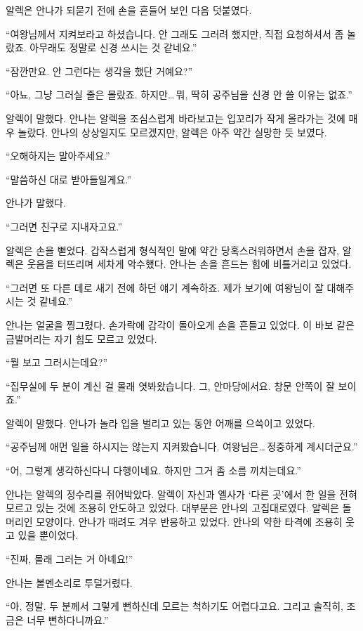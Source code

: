 알렉은 안나가 되묻기 전에 손을 흔들어 보인 다음 덧붙였다.

``여왕님께서 지켜보라고 하셨습니다. 안 그래도 그러려 했지만, 직접 요청하셔서 좀 놀랐죠. 아무래도 정말로 신경 쓰시는 것 같네요.''

``잠깐만요. 안 그런다는 생각을 했단 거예요?''

``아뇨, 그냥 그러실 줄은 몰랐죠. 하지만\ldots\,뭐, 딱히 공주님을 신경 안 쓸 이유는 없죠.''

알렉이 말했다. 안나는 알렉을 조심스럽게 바라보고는 입꼬리가 작게 올라가는 것에 매우 놀랐다. 안나의 상상일지도 모르겠지만, 알렉은 아주 약간 실망한 듯 보였다.

``오해하지는 말아주세요.''

``말씀하신 대로 받아들일게요.''

안나가 말했다.

``그러면 친구로 지내자고요.''

알렉은 손을 뻗었다. 갑작스럽게 형식적인 말에 약간 당혹스러워하면서 손을 잡자, 알렉은 웃음을 터뜨리며 세차게 악수했다. 안나는 손을 흔드는 힘에 비틀거리고 있었다.

``그러면 또 다른 데로 새기 전에 하던 얘기 계속하죠. 제가 보기에 여왕님이 잘 대해주시는 것 같네요.''

안나는 얼굴을 찡그렸다. 손가락에 감각이 돌아오게 손을 흔들고 있었다. 이 바보 같은 금발머리는 자기 힘도 모르고 있었다.

``뭘 보고 그러시는데요?''

``집무실에 두 분이 계신 걸 몰래 엿봐왔습니다. 그, 안마당에서요. 창문 안쪽이 잘 보이죠.''

알렉이 말했다. 안나가 놀라 입을 벌리고 있는 동안 어깨를 으쓱이고 있었다.

``공주님께 애먼 일을 하시지는 않는지 지켜봤습니다. 여왕님은\ldots\,정중하게 계시더군요.''

``어, 그렇게 생각하신다니 다행이네요. 하지만 그거 좀 소름 끼치는데요.''

안나는 알렉의 정수리를 쥐어박았다. 알렉이 자신과 엘사가 `다른 곳'에서 한 일을 전혀 모르고 있는 것에 조용히 안도하고 있었다. 대부분은 안나의 고집대로였다. 알렉은 돌머리인 모양이다. 안나가 때려도 겨우 반응하고 있었다. 안나의 약한 타격에 조용히 웃고 있을 뿐이었다.

``진짜, 몰래 그러는 거 아녜요!''

안나는 볼멘소리로 투덜거렸다.

``아, 정말. 두 분께서 그렇게 뻔하신데 모르는 척하기도 어렵다고요. 그리고 솔직히, 조금은 너무 뻔하다니까요.''

